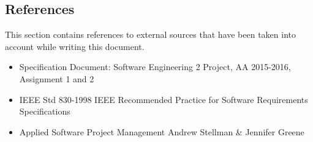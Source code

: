 \subsection{References}
This section contains references to external sources that have been taken into account while writing this document.
\begin{itemize}
	\item Specification Document: Software Engineering 2 Project, AA 2015-2016, Assignment 1 and 2
	\item IEEE Std 830-1998 IEEE Recommended Practice for Software Requirements Specifications
	\item Applied Software Project Management Andrew Stellman \& Jennifer Greene
\end{itemize}